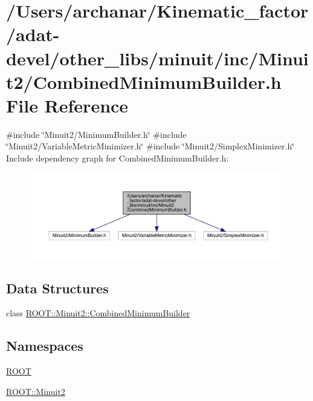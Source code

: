 \hypertarget{adat-devel_2other__libs_2minuit_2inc_2Minuit2_2CombinedMinimumBuilder_8h}{}\section{/\+Users/archanar/\+Kinematic\+\_\+factor/adat-\/devel/other\+\_\+libs/minuit/inc/\+Minuit2/\+Combined\+Minimum\+Builder.h File Reference}
\label{adat-devel_2other__libs_2minuit_2inc_2Minuit2_2CombinedMinimumBuilder_8h}
{\ttfamily \#include \char`\"{}Minuit2/\+Minimum\+Builder.\+h\char`\"{}}\newline
{\ttfamily \#include \char`\"{}Minuit2/\+Variable\+Metric\+Minimizer.\+h\char`\"{}}\newline
{\ttfamily \#include \char`\"{}Minuit2/\+Simplex\+Minimizer.\+h\char`\"{}}\newline
Include dependency graph for Combined\+Minimum\+Builder.\+h\+:
\nopagebreak
\begin{figure}[H]
\begin{center}
\leavevmode
\includegraphics[width=350pt]{d5/d9c/adat-devel_2other__libs_2minuit_2inc_2Minuit2_2CombinedMinimumBuilder_8h__incl}
\end{center}
\end{figure}
\subsection*{Data Structures}
\begin{DoxyCompactItemize}
\item 
class \mbox{\hyperlink{classROOT_1_1Minuit2_1_1CombinedMinimumBuilder}{R\+O\+O\+T\+::\+Minuit2\+::\+Combined\+Minimum\+Builder}}
\end{DoxyCompactItemize}
\subsection*{Namespaces}
\begin{DoxyCompactItemize}
\item 
 \mbox{\hyperlink{namespaceROOT}{R\+O\+OT}}
\item 
 \mbox{\hyperlink{namespaceROOT_1_1Minuit2}{R\+O\+O\+T\+::\+Minuit2}}
\end{DoxyCompactItemize}
